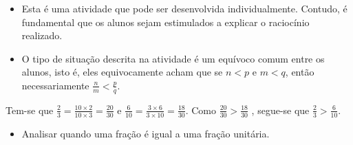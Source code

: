 \begin{orientacoes}{}{}

\begin{itemize} %
    \item       Esta é uma atividade que pode ser desenvolvida individualmente.
Contudo, é fundamental que os alunos sejam estimulados a explicar o raciocínio
realizado.
    \item       O tipo de situação descrita na atividade é um equívoco comum
entre os alunos, isto é, eles equivocamente acham que se       $n < p$       e
    $m < q$, então necessariamente       $\frac{n}{m} < \frac{p}{q}$.
\end{itemize} %




\end{orientacoes}

\begin{solucao}{}{}
  Tem-se que   $\frac{2}{3} = \frac{10 \times 2}{10 \times 3} = \frac{20}{30}$
e
  $\frac{6}{10} = \frac{3 \times 6}{3 \times 10} = \frac{18}{30}$.
  Como   $\frac{20}{30} > \frac{18}{30}$  , segue-se que   $\frac{2}{3} >
\frac{6}{10}$.
\end{solucao}
\clearpage

\begin{objetivos}[label=chap4-ativ22]{}{}

 
\begin{itemize} %
    \item       Analisar quando uma fração é igual a uma fração unitária.
\end{itemize} %
\end{objetivos}

